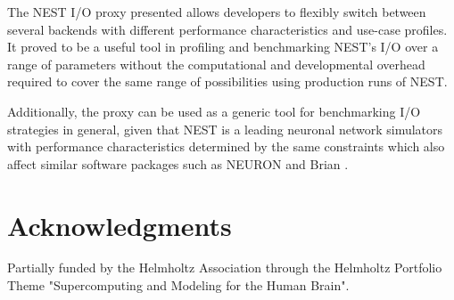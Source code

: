 \documentclass[]{YIC2015}
\begin{document}
The NEST I/O proxy presented allows developers to flexibly switch
between several backends with different performance characteristics
and use-case profiles. It proved to be a useful tool in profiling and
benchmarking NEST's I/O over a range of parameters without the
computational and developmental overhead required to cover the same
range of possibilities using production runs of NEST.

Additionally, the proxy can be used as a generic tool for benchmarking
I/O strategies in general, given that NEST is a leading neuronal
network simulators with performance characteristics determined by the
same constraints which also affect similar software packages such as
NEURON \cite{neuron} and Brian \cite{brian}.

\section*{Acknowledgments}

Partially funded by the Helmholtz Association through the Helmholtz
Portfolio Theme "Supercomputing and Modeling for the Human Brain".
\end{document}
